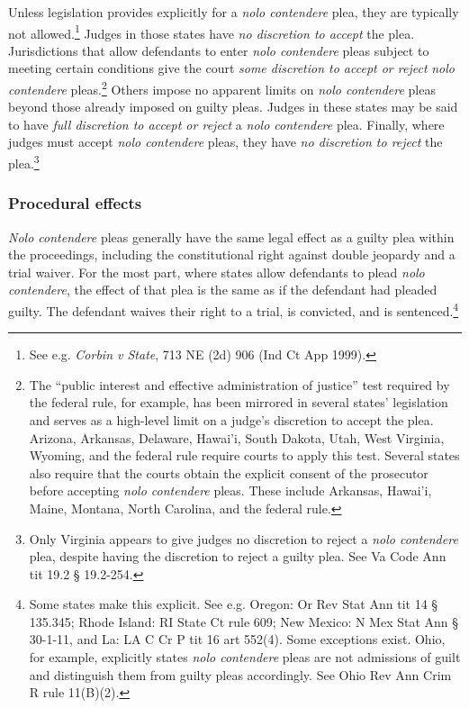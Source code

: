 Unless legislation provides explicitly for a \textit{nolo contendere} plea, they are typically not allowed.\footnote{See e.g. \textit{Corbin v State}, 713 NE (2d) 906 (Ind Ct App 1999).} Judges in those states have \textit{no discretion to accept} the plea. Jurisdictions that allow defendants to enter \textit{nolo contendere} pleas subject to meeting certain conditions give the court \textit{some discretion to accept or reject} \textit{nolo contendere} pleas.\footnote{The ``public interest and effective administration of justice” test required by the federal rule, for example, has been mirrored in several states' legislation and serves as a high-level limit on a judge's discretion to accept the plea. Arizona, Arkansas, Delaware, Hawai'i, South Dakota, Utah, West Virginia, Wyoming, and the federal rule require courts to apply this test. Several states also require that the courts obtain the explicit consent of the prosecutor before accepting \textit{nolo contendere} pleas. These include Arkansas, Hawai'i, Maine, Montana, North Carolina, and the federal rule.} Others impose no apparent limits on \textit{nolo contendere} pleas beyond those already imposed on guilty pleas. Judges in these states may be said to have \textit{full discretion to accept or reject} a \textit{nolo contendere} plea. Finally, where judges must accept \textit{nolo contendere} pleas, they have \textit{no discretion to reject} the plea.\footnote{Only Virginia appears to give judges no discretion to reject a \textit{nolo contendere} plea, despite having the discretion to reject a guilty plea. See Va Code Ann tit 19.2 § 19.2-254.}

\subsubsection{Procedural effects}

\textit{Nolo contendere} pleas generally have the same legal effect as a guilty plea within the proceedings, including the constitutional right against double jeopardy and a trial waiver. For the most part, where states allow defendants to plead \textit{nolo contendere}, the effect of that plea is the same as if the defendant had pleaded guilty. The defendant waives their right to a trial, is convicted, and is sentenced.\footnote{Some states make this explicit. See e.g. Oregon: Or Rev Stat Ann tit 14 § 135.345; Rhode Island: RI State Ct rule 609; New Mexico: N Mex Stat Ann § 30-1-11, and La: LA C Cr P tit 16 art 552(4). Some exceptions exist. Ohio, for example, explicitly states \textit{nolo contendere} pleas are not admissions of guilt and distinguish them from guilty pleas accordingly. See Ohio Rev Ann Crim R rule 11(B)(2).}

